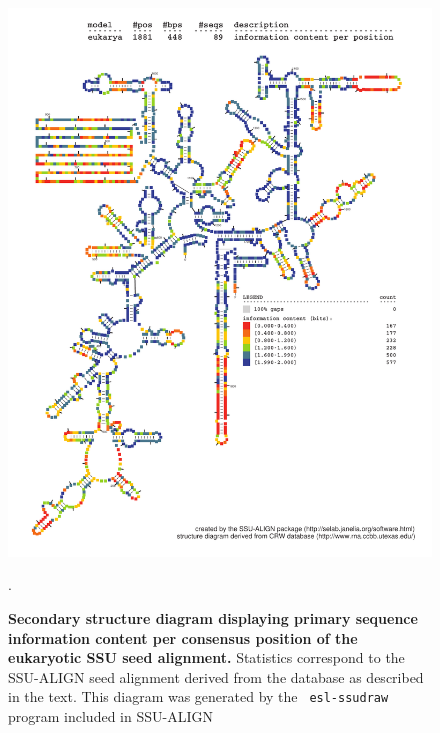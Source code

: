 \begin{figure}
\begin{center}
\includegraphics[width=5.7in]{Figures/eukarya-0p1-info}
\end{center}
\caption[Secondary structure diagram displaying primary sequence
  information content per consensus position of the eukaryotic SSU seed
  alignment]{\textbf{Secondary structure diagram displaying primary
  sequence information content per consensus position of the eukaryotic SSU seed
  alignment.} Statistics correspond to the SSU-ALIGN seed
  alignment derived from the  database \cite{CannoneGutell02}
  as described in the text. This diagram was generated by the {\tt
  esl-ssudraw} program included in SSU-ALIGN}.
\label{fig:eukinfo}
\end{figure}


